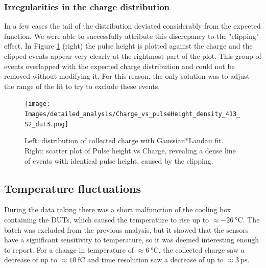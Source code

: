 \subsubsection{Irregularities in the charge distribution}\label{subsec:charge_irregularities}

In a few cases the tail of the distribution deviated considerably from the expected function. We were able to successfully attribute this discrepancy to the "clipping" effect. In Figure \ref{fig:charge_vs_pulseHeight_for_clipping} (right) the pulse height is plotted against the charge and the clipped events appear very clearly at the rightmost part of the plot. This group of events overlapped with the expected charge distribution and could not be removed without modifying it. For this reason, the only solution was to adjust the range of the fit to try to exclude these events.

\begin{figure}[h!tbp]
    \centering
    \texttt{[image: Images/detailed\_analysis/Charge\_vs\_pulseHeight\_density\_413\_S2\_dut3.png]}
    \captionsetup{width=\captionwidth}
    \caption{Left: distribution of collected charge with Gaussian*Landau fit. \\
    Right: scatter plot of Pulse height vs Charge, revealing a dense line of events with identical pulse height, caused by the clipping.}
    \label{fig:charge_vs_pulseHeight_for_clipping}
\end{figure}

\FloatBarrier

\subsection{Temperature fluctuations}\label{sec:temperature_fluctuations}

During the data taking there was a short malfunction of the cooling box containing the DUTs, which caused the temperature to rise up to \(\approx\qty{-26}{\degreeCelsius}\). The batch was excluded from the previous analysis, but it showed that the sensors have a significant sensitivity to temperature, so it was deemed interesting enough to report. For a change in temperature of \(\approx\qty{6}{\degreeCelsius}\), the collected charge saw a decrease of up to \(\approx\qty{10}{\femto\coulomb}\) and time resolution saw a decrease of up to \(\approx\qty{3}{\pico\second}\).

